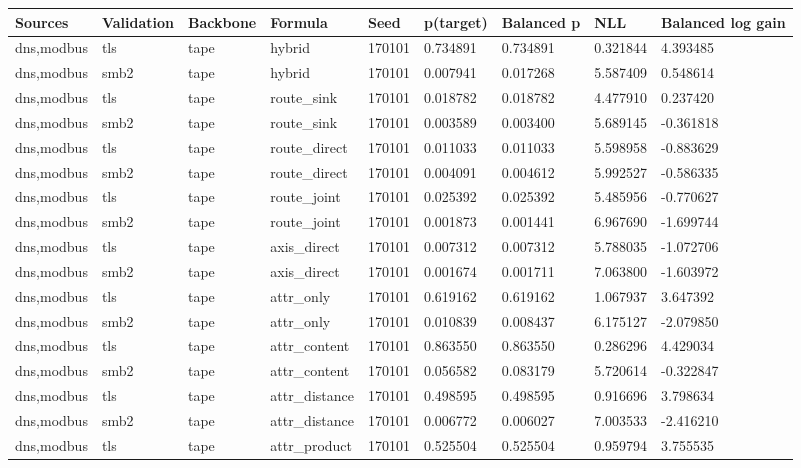 \begin{tabular}{lllllllll}
\hline
Sources & Validation & Backbone & Formula & Seed & p(target) & Balanced p & NLL & Balanced log gain \\
\hline
dns,modbus & tls & tape & hybrid & 170101 & 0.734891 & 0.734891 & 0.321844 & 4.393485 \\
dns,modbus & smb2 & tape & hybrid & 170101 & 0.007941 & 0.017268 & 5.587409 & 0.548614 \\
dns,modbus & tls & tape & route\_sink & 170101 & 0.018782 & 0.018782 & 4.477910 & 0.237420 \\
dns,modbus & smb2 & tape & route\_sink & 170101 & 0.003589 & 0.003400 & 5.689145 & -0.361818 \\
dns,modbus & tls & tape & route\_direct & 170101 & 0.011033 & 0.011033 & 5.598958 & -0.883629 \\
dns,modbus & smb2 & tape & route\_direct & 170101 & 0.004091 & 0.004612 & 5.992527 & -0.586335 \\
dns,modbus & tls & tape & route\_joint & 170101 & 0.025392 & 0.025392 & 5.485956 & -0.770627 \\
dns,modbus & smb2 & tape & route\_joint & 170101 & 0.001873 & 0.001441 & 6.967690 & -1.699744 \\
dns,modbus & tls & tape & axis\_direct & 170101 & 0.007312 & 0.007312 & 5.788035 & -1.072706 \\
dns,modbus & smb2 & tape & axis\_direct & 170101 & 0.001674 & 0.001711 & 7.063800 & -1.603972 \\
dns,modbus & tls & tape & attr\_only & 170101 & 0.619162 & 0.619162 & 1.067937 & 3.647392 \\
dns,modbus & smb2 & tape & attr\_only & 170101 & 0.010839 & 0.008437 & 6.175127 & -2.079850 \\
dns,modbus & tls & tape & attr\_content & 170101 & 0.863550 & 0.863550 & 0.286296 & 4.429034 \\
dns,modbus & smb2 & tape & attr\_content & 170101 & 0.056582 & 0.083179 & 5.720614 & -0.322847 \\
dns,modbus & tls & tape & attr\_distance & 170101 & 0.498595 & 0.498595 & 0.916696 & 3.798634 \\
dns,modbus & smb2 & tape & attr\_distance & 170101 & 0.006772 & 0.006027 & 7.003533 & -2.416210 \\
dns,modbus & tls & tape & attr\_product & 170101 & 0.525504 & 0.525504 & 0.959794 & 3.755535 \\

\end{tabular}

